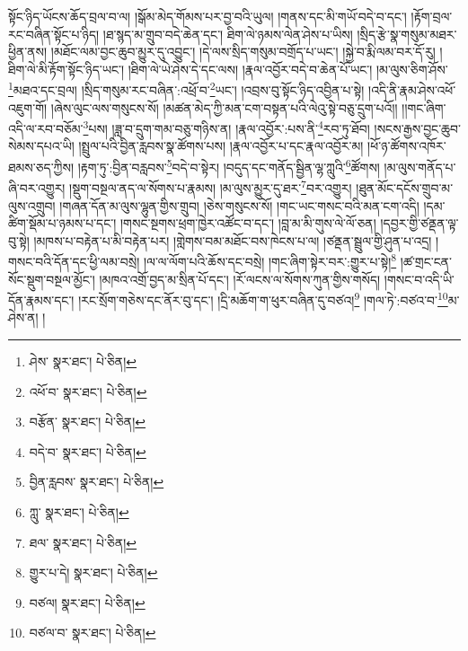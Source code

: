 སྟོང་ཉིད་ཡོངས་ཆོད་བྲལ་བ་ལ། །སྒོམ་མེད་གོམས་པར་བྱ་བའི་ཡུལ། །གནས་དང་མི་གཡོ་བདེ་བ་དང་། །རྟོག་བྲལ་རང་བཞིན་སྟོང་པ་ཉིད། །ཐ་སྙད་མ་གྲུབ་བདེ་ཆེན་དང་། ཐིག་ལེ་ཉམས་ལེན་ཤེས་པ་ཡིས། །སྲིད་རྩེ་སྣ་གསུམ་མཐར་ཕྱིན་ནས། །མཐོང་ལམ་བྱང་ཆུབ་མྱུར་དུ་འབྱུང་། །དེ་ལས་སྲིད་གསུམ་བགྲོད་པ་ཡང་། །སྐྱེ་བ་རྨི་ལམ་བར་དོ་རུ། །ཐིག་ལེ་མི་རྟོག་སྟོང་ཉིད་ཡང་། །ཐིག་ལེ་ཡེ་ཤེས་དེ་དང་ལས། །རྣལ་འབྱོར་བདེ་བ་ཆེན་པོ་ཡང་། །མ་ལུས་ཅིག་ཤོས་\footnote{ཤེས་  སྣར་ཐང་།  པེ་ཅིན། }མཐའ་དང་བྲལ། །སྲིད་གསུམ་རང་བཞིན་:འཕྲོ་བ་\footnote{འཕོ་བ་  སྣར་ཐང་།  པེ་ཅིན། }ཡང་། །འབྲས་བུ་སྟོང་ཉིད་འབྱིན་པ་སྟེ། །འདི་ནི་རྣམ་ཤེས་འཕོ་འཇུག་གོ། །ཞེས་ལུང་ལས་གསུངས་སོ། །མཚན་མེད་ཀྱི་མན་ངག་བསྟན་པའི་ལེའུ་སྟེ་བཅུ་དྲུག་པའོ།། །།གང་ཞིག་འདི་ལ་རབ་བཅོམ་\footnote{བརྩོན་  སྣར་ཐང་།  པེ་ཅིན། }པས། །ཟླ་བ་དྲུག་གམ་བཅུ་གཉིས་ན། །རྣལ་འབྱོར་:པས་ནི་\footnote{བདེ་བ་  སྣར་ཐང་།  པེ་ཅིན། }རབ་ཏུ་ཐོབ། །སངས་རྒྱས་བྱང་ཆུབ་སེམས་དཔའ་ཡི། །སྤྲུལ་པའི་བྱིན་རླབས་སྣ་ཚོགས་པས། །རྣལ་འབྱོར་པ་དང་རྣལ་འབྱོར་མ། །ཕོ་ཉ་ཚོགས་འཁོར་ཐམས་ཅད་ཀྱིས། །རྟག་ཏུ་:བྱིན་བརླབས་\footnote{བྱིན་རླབས་  སྣར་ཐང་།  པེ་ཅིན། }བདེ་བ་སྟེར། །བདུད་དང་གནོད་སྦྱིན་ལྷ་ཀླུའི་\footnote{ཀླུ་  སྣར་ཐང་།  པེ་ཅིན། }ཚོགས། །མ་ལུས་གནོད་པ་ཞི་བར་འགྱུར། །སྡུག་བསྔལ་ནད་ལ་སོགས་པ་རྣམས། །མ་ལུས་མྱུར་དུ་ཐར་\footnote{ཐལ་  སྣར་ཐང་།  པེ་ཅིན། }བར་འགྱུར། །ཐུན་མོང་དངོས་གྲུབ་མ་ལུས་འགྲུབ། །གཞན་དོན་མ་ལུས་ལྷུན་གྱིས་གྲུབ། །ཅེས་གསུངས་སོ། །གང་ཡང་གསང་བའི་མན་ངག་འདི། །དམ་ཚིག་སྡོམ་པ་ཉམས་པ་དང་། །གསང་སྔགས་ཕྲག་ཁྱེར་འཚོང་བ་དང་། །བླ་མ་མི་གུས་ལེ་ལོ་ཅན། །དབྱར་གྱི་ཙནྡན་ལྟ་བུ་སྟེ། །མཁས་པ་བརྟེན་པ་མི་བརྟེན་པར། །གླེགས་བམ་མཐོང་བས་ཁེངས་པ་ལ། །ཙནྡན་སྦྲུལ་གྱི་ཤུན་པ་འདྲ། །གསང་བའི་དོན་དང་ཕྱི་ལམ་བསྲེ། །ལ་ལ་ལོག་པའི་ཆོས་དང་བསྲེ། །གང་ཞིག་སྟེར་བར་:གྱུར་པ་སྟེ།\footnote{གྱུར་པ་དེ།  སྣར་ཐང་།  པེ་ཅིན། } །ཚ་གྲང་ངན་སོང་སྡུག་བསྔལ་མྱོང་། །མཁའ་འགྲོ་བྱད་མ་སྲིན་པོ་དང་། །རོ་ལངས་ལ་སོགས་ཀུན་གྱིས་གསོད། །གསང་བ་འདི་ཡི་དོན་རྣམས་དང་། །རང་སྲོག་གཅེས་དང་ནོར་བུ་དང་། །དྲི་མཆོག་ག་ཕུར་བཞིན་དུ་བཙའ།\footnote{བཙལ།  སྣར་ཐང་།  པེ་ཅིན། } །གལ་ཏེ་:བཙའ་བ་\footnote{བཙལ་བ་  སྣར་ཐང་།  པེ་ཅིན། }མ་ཤེས་ན། །
